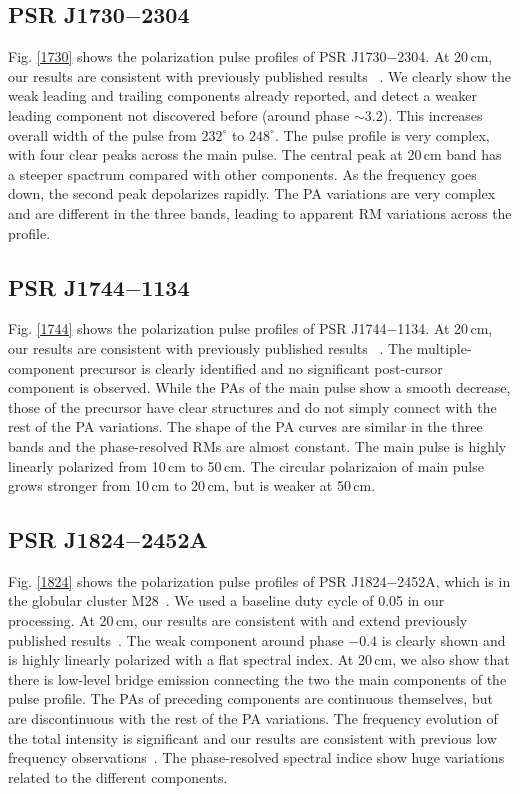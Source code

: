 \documentclass[useAMS,usenatbib]{mn2e}
\begin{document}
\subsection{PSR J1730$-$2304}

Fig. \ref{1730} shows the polarization pulse profiles of 
PSR J1730$-$2304.
%
At 20\,cm, our results are consistent with previously published results
~\citep{Ord04,Yan11}. 
%
We clearly show the weak leading and trailing components already reported, 
and detect a weaker leading component not discovered before (around phase $\sim3.2$). 
This increases overall width of the pulse from $232^{\circ}$ to $248^{\circ}$.
%
The pulse profile is very complex, with four clear peaks across the main pulse.
%
The central peak at 20\,cm band has a steeper spactrum compared with other 
components.
%
As the frequency goes down, the second peak depolarizes rapidly.
%
The PA variations are very complex and are different in the three bands, 
leading to apparent RM variations across the profile.

\subsection{PSR J1744$-$1134}

Fig. \ref{1744} shows the polarization pulse profiles of 
PSR J1744$-$1134.
%
At 20\,cm, our results are consistent with previously published results
~\citep{Yan11}.
%
The multiple-component precursor is clearly identified and no significant 
post-cursor component is observed.
%
While the PAs of the main pulse show a smooth decrease, those of the precursor 
have clear structures and do not simply connect with the rest of the PA 
variations.
%
The shape of the PA curves are similar in the three bands and the phase-resolved 
RMs are almost constant.
%
The main pulse is highly linearly polarized from 10\,cm to 50\,cm. 
The circular polarizaion of main pulse grows stronger from 10\,cm to 20\,cm, 
but is weaker at 50\,cm.

\subsection{PSR J1824$-$2452A}

Fig. \ref{1824} shows the polarization pulse profiles of 
PSR J1824$-$2452A, which is in the globular cluster M28~\citep{Lyne87}.
%
We used a baseline duty cycle of 0.05 in our processing.
%
At 20\,cm, our results are consistent with and extend previously published 
results~\citep{Ord04,Yan11}.
%
The weak component around phase $-0.4$ is clearly shown and is highly 
linearly polarized with a flat spectral index. 
%
At 20\,cm, we also show that there is low-level bridge emission 
connecting the two the main components of the pulse profile.
%
The PAs of preceding components are continuous themselves, but are 
discontinuous with the rest of the PA variations.
%
The frequency evolution of the total intensity is significant and 
our results are consistent with previous low frequency observations~\citep[e.g.,][]{Stairs99}.
The phase-resolved spectral indice show huge variations related to the 
different components. 
%
\end{document}
